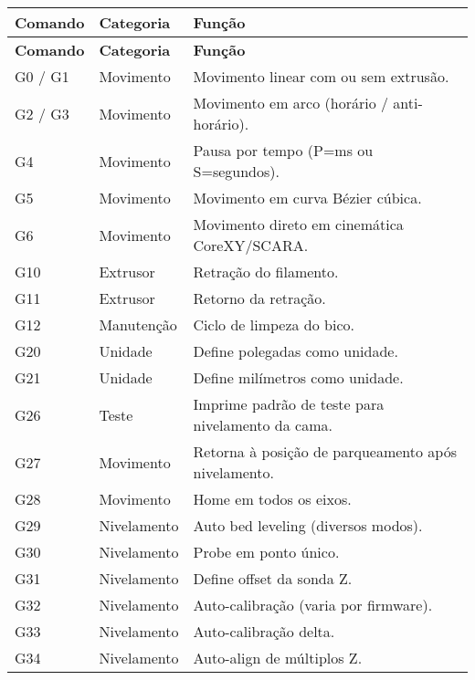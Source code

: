 
\newlength{\funcwidth}
\setlength{\funcwidth}{.65\linewidth} %

\begin{longtable}{|l|l|p{\funcwidth}|}
	\hline
	\textbf{Comando} & \textbf{Categoria} & \textbf{Função} \\
	\hline
	\endfirsthead
	\hline
	\textbf{Comando} & \textbf{Categoria} & \textbf{Função} \\
	\hline
	\endhead
	\hline %
	\endfoot
	\hline %
	\endlastfoot
	
			
			G0 / G1 & Movimento & Movimento linear com ou sem extrusão. \\
			G2 / G3 & Movimento & Movimento em arco (horário / anti-horário). \\
			G4 & Movimento & Pausa por tempo (P=ms ou S=segundos). \\
			G5 & Movimento & Movimento em curva Bézier cúbica. \\
			G6 & Movimento & Movimento direto em cinemática CoreXY/SCARA. \\
			G10 & Extrusor & Retração do filamento. \\
			G11 & Extrusor & Retorno da retração. \\
			G12 & Manutenção & Ciclo de limpeza do bico. \\
			G20 & Unidade & Define polegadas como unidade. \\
			G21 & Unidade & Define milímetros como unidade. \\
			G26 & Teste & Imprime padrão de teste para nivelamento da cama. \\
			G27 & Movimento & Retorna à posição de parqueamento após nivelamento. \\
			G28 & Movimento & Home em todos os eixos. \\
			G29 & Nivelamento & Auto bed leveling (diversos modos). \\
			G30 & Nivelamento & Probe em ponto único. \\
			G31 & Nivelamento & Define offset da sonda Z. \\
			G32 & Nivelamento & Auto-calibração (varia por firmware). \\
			G33 & Nivelamento & Auto-calibração delta. \\
			G34 & Nivelamento & Auto-align de múltiplos Z. \\

\end{longtable}
